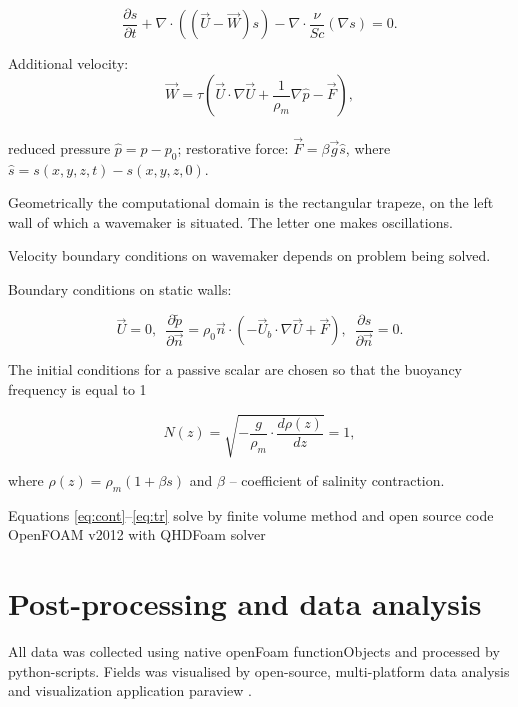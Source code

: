\documentclass[a4wide,fontsize=12pt]{article}
\begin{document}
 \begin{equation}
     \frac{\partial s}{\partial t} + \nabla \cdot \left ( (\vec U - \vec W)s \right )
     - \nabla \cdot \frac{\nu}{Sc} \left ( \nabla s \right )=0.
     \label{eq:tr}
 \end{equation}


Additional velocity:  $$\vec W = \tau \left ( \vec U \cdot \nabla \vec U + \frac{1}{\rho_m} \nabla \hat p - \vec F  \right ),$$\\

reduced pressure $\hat p = p - p_0$; restorative force: $\vec{F}=\beta \vec{g} \hat s$, where $\hat s = s(x, y, z, t) - s(x, y, z, 0).$

Geometrically the computational domain is the rectangular trapeze, on the left wall of which a wavemaker is situated. The letter one makes oscillations. 

Velocity boundary conditions on wavemaker depends on problem being solved.

Boundary conditions on static walls:

\begin{equation}\label{eq:qhd_walls}
        \vec{U} = 0, \,\,\, \frac{\partial \tilde p}{ \partial \vec{n}} = \rho_0 \vec n \cdot \left ( -\vec U_b \cdot \nabla \vec U + \vec F \right), \,\,\, \frac{\partial s}{ \partial \vec{n}} = 0.
\end{equation}

The initial conditions for a passive scalar are chosen so that the buoyancy frequency is equal to 1

\begin{equation}
    N(z) = \sqrt{- \frac{g}{\rho_m}\cdot\frac{d \rho(z)}{dz}} = 1,
\end{equation}

where $\rho(z) = \rho_m(1+\beta s)$  and $\beta$ -- coefficient of salinity contraction. 



Equations \ref{eq:cont}--\ref{eq:tr} solve by finite volume method and open source code OpenFOAM v2012 with QHDFoam solver \cite{QGDFOam}

\section{Post-processing and data analysis}

All data was collected using native openFoam functionObjects and processed by python-scripts. Fields was visualised by open-source, multi-platform data analysis and visualization application paraview \cite{paraview}.
\end{document}
